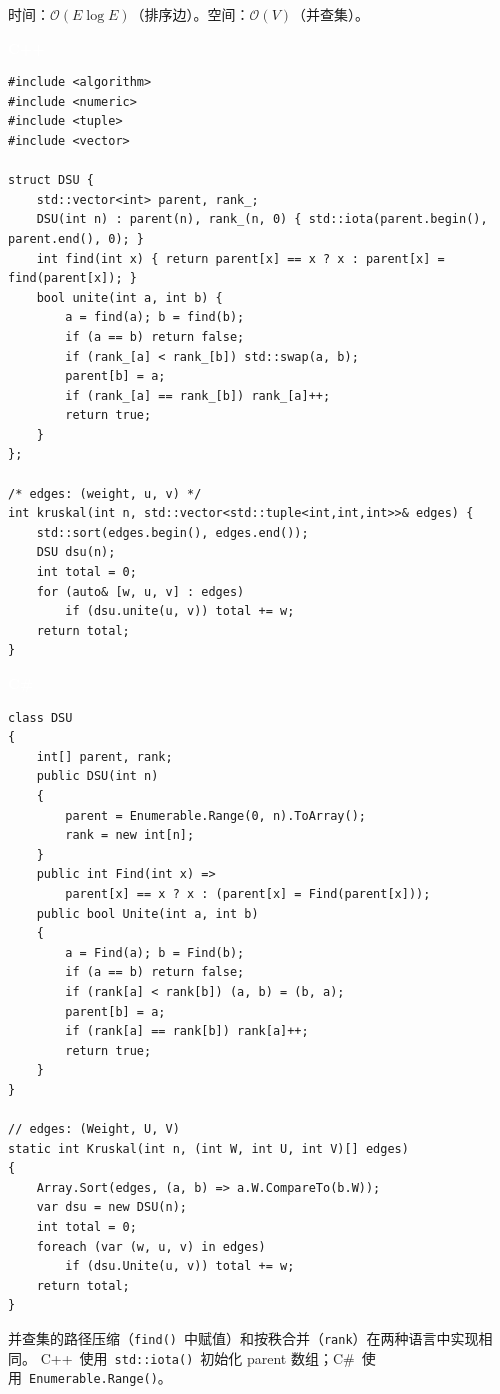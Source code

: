 \documentclass[12pt,a4paper,fontset=fandol]{ctexbook}
\newcommand{\cpplabel}{%
  \noindent\begin{tcolorbox}[sharp corners,colback=cppheadbg,colframe=cppheadbg,
    left=6pt,right=6pt,top=2pt,bottom=2pt,boxrule=0pt]
  \textcolor{white}{\small\bfseries\sffamily C++}\end{tcolorbox}%
}
\newcommand{\csharplabel}{%
  \noindent\begin{tcolorbox}[sharp corners,colback=csharpheadbg,colframe=csharpheadbg,
    left=6pt,right=6pt,top=2pt,bottom=2pt,boxrule=0pt]
  \textcolor{white}{\small\bfseries\sffamily C\#}\end{tcolorbox}%
}
\newcommand{\bigO}[1]{\mathcal{O}(#1)}
\newcommand{\Fn}[1]{\texttt{#1()}}
\begin{document}
\begin{complexitybox}
  时间：$\bigO{E \log E}$（排序边）。空间：$\bigO{V}$（并查集）。
\end{complexitybox}

\cpplabel
\begin{lstlisting}[style=cppstyle]
#include <algorithm>
#include <numeric>
#include <tuple>
#include <vector>

struct DSU {
    std::vector<int> parent, rank_;
    DSU(int n) : parent(n), rank_(n, 0) { std::iota(parent.begin(), parent.end(), 0); }
    int find(int x) { return parent[x] == x ? x : parent[x] = find(parent[x]); }
    bool unite(int a, int b) {
        a = find(a); b = find(b);
        if (a == b) return false;
        if (rank_[a] < rank_[b]) std::swap(a, b);
        parent[b] = a;
        if (rank_[a] == rank_[b]) rank_[a]++;
        return true;
    }
};

/* edges: (weight, u, v) */
int kruskal(int n, std::vector<std::tuple<int,int,int>>& edges) {
    std::sort(edges.begin(), edges.end());
    DSU dsu(n);
    int total = 0;
    for (auto& [w, u, v] : edges)
        if (dsu.unite(u, v)) total += w;
    return total;
}
\end{lstlisting}

\csharplabel
\begin{lstlisting}[style=csharpstyle]
class DSU
{
    int[] parent, rank;
    public DSU(int n)
    {
        parent = Enumerable.Range(0, n).ToArray();
        rank = new int[n];
    }
    public int Find(int x) =>
        parent[x] == x ? x : (parent[x] = Find(parent[x]));
    public bool Unite(int a, int b)
    {
        a = Find(a); b = Find(b);
        if (a == b) return false;
        if (rank[a] < rank[b]) (a, b) = (b, a);
        parent[b] = a;
        if (rank[a] == rank[b]) rank[a]++;
        return true;
    }
}

// edges: (Weight, U, V)
static int Kruskal(int n, (int W, int U, int V)[] edges)
{
    Array.Sort(edges, (a, b) => a.W.CompareTo(b.W));
    var dsu = new DSU(n);
    int total = 0;
    foreach (var (w, u, v) in edges)
        if (dsu.Unite(u, v)) total += w;
    return total;
}
\end{lstlisting}

\begin{compare}
并查集的路径压缩（\Fn{find}~中赋值）和按秩合并（\texttt{rank}）在两种语言中实现相同。
C++~使用~\Fn{std::iota}~初始化 parent 数组；C\#~使用~\Fn{Enumerable.Range}。
\end{compare}
\end{document}
